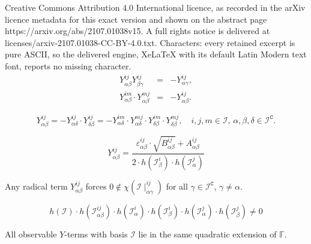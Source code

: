 \documentclass[10pt,a4paper]{amsart}
\begin{document}
Creative Commons Attribution 4.0 International licence, as recorded in the arXiv licence metadata for this exact version and shown on the abstract page https://arxiv.org/abs/2107.01038v15. A full rights notice is delivered at licenses/arxiv-2107.01038-CC-BY-4.0.txt. Characters: every retained excerpt is pure ASCII, so the delivered engine, XeLaTeX with its default Latin Modern text font, reports no missing character.
\begin{eqnarray}
Y_{\alpha\beta}^{ij}Y_{\beta\gamma}^{ij} & = & -Y_{\alpha\gamma}^{ij},\label{eq: associativity, d}\\
Y_{\alpha\beta}^{im}\cdot Y_{\alpha\beta}^{mj} & = & -Y_{\alpha\beta}^{ij}.
\label{eq: associativity, u}
\end{eqnarray}

\begin{equation}
    Y_{\alpha\beta}^{ij} = -Y_{\alpha\delta}^{ij}\cdot Y_{\delta\beta}^{ij} 
    = -Y_{\alpha\delta}^{im}\cdot Y_{\alpha\delta}^{mj}\cdot Y_{\delta\beta}^{im}\cdot Y_{\delta\beta}^{mj},\quad i,j,m\in\mathcal{I},\,\alpha,\beta,\delta\in\mathcal{I}^{\mathtt{C}}.
    \label{eq: quadrilateral decomposition}
\end{equation}

 \begin{equation}
Y_{\alpha\beta}^{ij}=\frac{\varepsilon_{\alpha\beta}^{ij}\cdot\sqrt{B_{\alpha\beta}^{ij}}+A_{\alpha\beta}^{ij}}{2\cdot h(\mathcal{I}_{\beta}^{i})\cdot h(\mathcal{I}_{\alpha}^{j})}\label{eq: radical expression}
 \end{equation}

\begin{lem}
\label{lem: observable sets with 0 are algebraic}
Any radical term $Y_{\alpha\beta}^{ij}$ forces $0\notin\chi(\mathcal{I}\mid_{\alpha\gamma}^{ij})$ for all $\gamma\in\mathcal{I}^{\mathtt{C}}$, $\gamma\neq \alpha$. 
\end{lem}

 \begin{equation}
h(\mathcal{I})\cdot h(\mathcal{I}_{\alpha\beta}^{ij})\cdot h(\mathcal{I}_{\alpha}^{i})\cdot h(\mathcal{I}_{\beta}^{i})\cdot h(\mathcal{I}_{\alpha}^{j})\cdot h(\mathcal{I}_{\beta}^{j})\neq0
\label{eq: all 3 terms non-vanishing}
 \end{equation}

\begin{lem}
\label{lem: common squarefree} All observable $Y$-terms with basis $\mathcal{I}$ lie in the same quadratic extension of $\mathbb{F}$. 
\end{lem}
\end{document}
